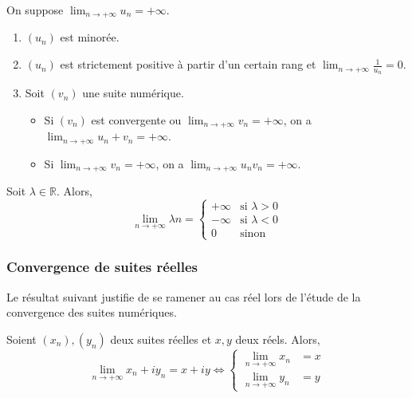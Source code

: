   \begin{proposition}
    On suppose $\lim_{n \rightarrow +\infty} u_n = +\infty$.
    \begin{enumerate}[label=(\roman*)]
      \item $(u_n)$ est minorée.
      \item $(u_n)$ est strictement positive à partir d'un certain rang et $\lim_{n \rightarrow +\infty} \frac{1}{u_n} = 0$.
      \item Soit $(v_n)$ une suite numérique.
      \begin{itemize}
        \item Si $(v_n)$ est convergente ou $\lim_{n \rightarrow +\infty} v_n = +\infty$, on a $\lim_{n \rightarrow +\infty} u_n + v_n = +\infty$.
        \item Si $\lim_{n \rightarrow +\infty} v_n = +\infty$, on a $\lim_{n \rightarrow +\infty} u_n v_n = +\infty$.
      \end{itemize}
    \end{enumerate}
  \end{proposition}


  \begin{example}
    Soit $\lambda \in \mathbb{R}$. Alors,
    \[
    \lim_{n \rightarrow +\infty} \lambda n =
    \begin{cases}
      +\infty &\text{si } \lambda > 0 \\
      -\infty &\text{si } \lambda < 0 \\
      0 &\text{sinon}
    \end{cases}
    \]
  \end{example}

  \subsubsection{Convergence de suites réelles}


  Le résultat suivant justifie de se ramener au cas réel lors de l'étude de la convergence des suites numériques.

  \begin{proposition}
    Soient $(x_n), (y_n)$ deux suites réelles et $x, y$ deux réels. Alors,
    \[
    \lim_{n \rightarrow +\infty} x_n + iy_n = x+iy \iff
    \begin{cases}
      \lim_{n \rightarrow +\infty} x_n &= x \\
      \lim_{n \rightarrow +\infty} y_n &= y
    \end{cases}
    \]
  \end{proposition}

